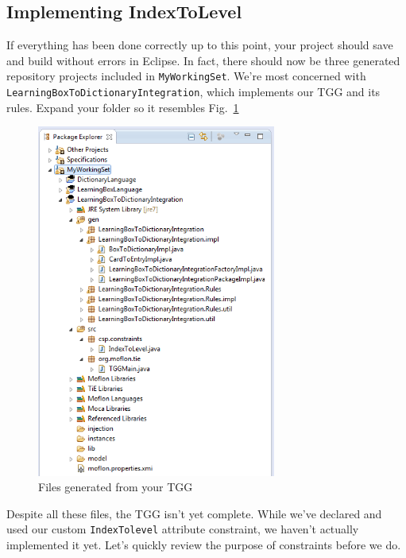 \newpage
\hypertarget{subsec:IndexToLevel}{}
\subsection{Implementing IndexToLevel}
\genHeader

If everything has been done correctly up to this point, your project should save and build without errors in Eclipse. In fact, there should now be three
generated repository projects included in \texttt{MyWorkingSet}. We're most concerned with \texttt{LearningBox\-To\-Dictionary\-Integration}, which implements
our TGG and its rules. Expand your folder so it resembles Fig.~\ref{eclipse:tggGenerated}


\begin{figure}[htbp]
\begin{center}
  \includegraphics[width=0.7\textwidth]{eclipse_generatedTGG}
  \caption{Files generated from your TGG}
  \label{eclipse:tggGenerated}
\end{center}
\end{figure}

Despite all these files, the TGG isn't yet complete. While we've declared and used our custom \texttt{IndexTolevel} attribute constraint, we haven't actually
implemented it yet. Let's quickly review the purpose of constraints before we do.

